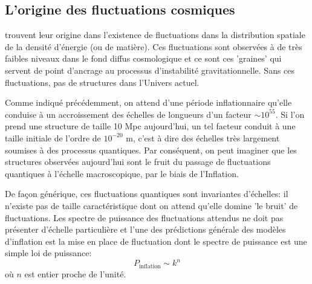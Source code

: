 \subsection{L'origine des fluctuations cosmiques}
 trouvent leur origine dans l'existence de fluctuations dans la distribution spatiale de la densité d'énergie (ou de matière). Ces fluctuations sont observées à de très faibles niveaux dans le fond diffus cosmologique et ce sont ces 'graines' qui servent de point d'ancrage au processus d'instabilité gravitationnelle. Sans ces fluctuations, pas de structures dans l'Univers actuel. 

Comme indiqué précédemment, on attend d'une période inflationnaire qu'elle conduise à un accroissement des échelles de longueurs d'un facteur $\sim 10^{55}$. Si l'on prend une structure de taille 10 Mpc aujourd'hui, un tel facteur conduit à  une taille initiale de l'ordre de $10^{-20}$ m, c'est à dire des échelles très largement soumises à des processus quantiques. Par conséquent, on peut imaginer que les structures observées aujourd'hui sont le fruit du passage de fluctuations quantiques à l'échelle macroscopique, par le biais de l'Inflation. 

De façon générique, ces fluctuations quantiques sont invariantes d'échelles: il n'existe pas de taille caractéristique dont on attend qu'elle domine 'le bruit' de fluctuations. Les spectre de puissance des fluctuations attendus ne doit pas présenter d'échelle particulière et l'une des prédictions générale des modèles d'inflation est la mise en place de fluctuation dont le spectre de puissance est une simple loi de puissance:
\begin{equation}
P_\mathrm{inflation}\sim k^n
\end{equation}
où $n$ est entier proche de l'unité.

